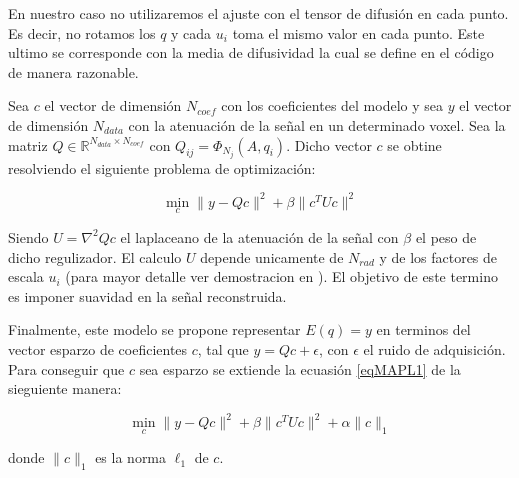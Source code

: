 \documentclass[11pt,a4paper,twoside]{tesis}
\begin{document}
En nuestro caso no utilizaremos el ajuste con el tensor de difusi\'on en cada punto. Es decir, 
no rotamos los $q$ y cada $u_i$ toma el mismo valor en cada punto. Este ultimo se 
corresponde con la media de difusividad la cual se define en el c\'odigo de manera razonable.

Sea $c$ el vector de dimensi\'on $N_{coef}$ con los coeficientes del modelo y sea $y$ el vector de 
dimensi\'on $N_{data}$ con la atenuaci\'on de la se\~nal en un determinado voxel. Sea la matriz $Q 
\in \mathbb{R}^{N_{data} \times N_{coef}}$ con $Q_{ij}=\Phi_{N_j}(A, q_i)$. Dicho vector $c$ se 
obtine resolviendo el siguiente problema de optimizaci\'on:



\begin{equation}
\label{eqMAPL1}
    \min_{c} \| y-Qc\|^2 + \beta \|c^T U c\|^2
\end{equation}


Siendo $U = \nabla^2 Qc$ el laplaceano de la atenuaci\'on de la se\~nal con $\beta$ el peso de 
dicho regulizador. El calculo $U$ depende unicamente de $N_{rad}$ y de los 
factores de escala $u_i$ (para mayor detalle ver demostracion en \citep{Fick2016365}). El objetivo 
de este termino es imponer suavidad en la se\~nal reconstruida.


Finalmente, este modelo se propone representar $E(q) = y$ en terminos del vector esparzo de
coeficientes $c$, tal que $y = Q c + \epsilon$, con $\epsilon$ el ruido de adquisici\'on. Para 
conseguir que $c$ sea esparzo se extiende la ecuasi\'on \ref{eqMAPL1} de la sieguiente manera:


\begin{equation}
\label{eqMAPL}
    \min_{c} \| y-Qc\|^2 + \beta \|c^T U c\|^2 + \alpha \| c\|_1
\end{equation}


donde $ \| c\|_1$ es la norma $\ell_1$ de $c$.










\end{document}
